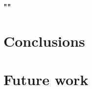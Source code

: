 \subsection*{""}

\chapter{Conclusions\label{ch:conclusions}}


\chapter{Future work\label{ch:future_work}}
